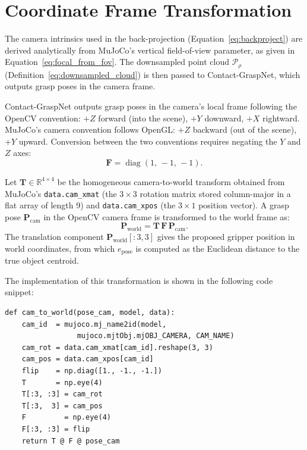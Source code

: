 \documentclass[11pt,a4paper]{report}
\begin{document}
\section{Coordinate Frame Transformation}
\label{sec:frame_transform}

The camera intrinsics used in the back-projection (Equation~\eqref{eq:backproject}) are
derived analytically from MuJoCo's vertical field-of-view parameter, as given in
Equation~\eqref{eq:focal_from_fov}.  The downsampled point cloud $\mathcal{P}_\rho$
(Definition~\eqref{eq:downsampled_cloud}) is then passed to Contact-GraspNet, which
outputs grasp poses in the camera frame.

Contact-GraspNet outputs grasp poses in the camera's local frame following the OpenCV convention: $+Z$ forward (into the scene), $+Y$ downward, $+X$ rightward. MuJoCo's camera convention follows OpenGL: $+Z$ backward (out of the scene), $+Y$ upward. Conversion between the two conventions requires negating the $Y$ and $Z$ axes:
\begin{equation}
  \mathbf{F} = \operatorname{diag}(1,\, -1,\, -1).
  \label{eq:flip}
\end{equation}

Let $\mathbf{T} \in \mathbb{R}^{4 \times 4}$ be the homogeneous camera-to-world transform obtained from MuJoCo's \texttt{data.cam\_xmat} (the $3 \times 3$ rotation matrix stored column-major in a flat array of length 9) and \texttt{data.cam\_xpos} (the $3 \times 1$ position vector). A grasp pose $\mathbf{P}_{\text{cam}}$ in the OpenCV camera frame is transformed to the world frame as:
\begin{equation}
  \mathbf{P}_{\text{world}} = \mathbf{T} \, \mathbf{F} \, \mathbf{P}_{\text{cam}}.
  \label{eq:transform}
\end{equation}
The translation component $\mathbf{P}_{\text{world}}[:3, 3]$ gives the proposed gripper position in world coordinates, from which $e_{\text{pose}}$ is computed as the Euclidean distance to the true object centroid.

The implementation of this transformation is shown in the following code snippet:

\begin{lstlisting}[caption={Camera-to-world frame transformation.},label={lst:cam_to_world}]
def cam_to_world(pose_cam, model, data):
    cam_id  = mujoco.mj_name2id(model,
                 mujoco.mjtObj.mjOBJ_CAMERA, CAM_NAME)
    cam_rot = data.cam_xmat[cam_id].reshape(3, 3)
    cam_pos = data.cam_xpos[cam_id]
    flip    = np.diag([1., -1., -1.])
    T       = np.eye(4)
    T[:3, :3] = cam_rot
    T[:3,  3] = cam_pos
    F         = np.eye(4)
    F[:3, :3] = flip
    return T @ F @ pose_cam
\end{lstlisting}
\end{document}
